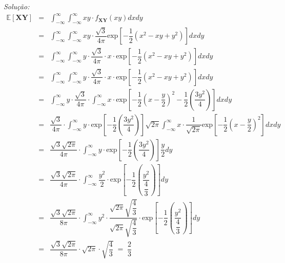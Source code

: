 \documentclass[a4paper, 11pt]{article}
\begin{document}
\noindent
\textit{Solução:} \\
\begin{equation*}
\begin{array}{lclllll}
\mathds{E}[\mathbf{X}\mathbf{Y}] & = & \displaystyle\int_{-\infty}^{\infty}\displaystyle\int_{-\infty}^{\infty} xy \cdot f_{\mathbf{XY}}(xy) dxdy \\[10pt] 

& = & \displaystyle\int_{-\infty}^{\infty}\displaystyle\int_{-\infty}^{\infty} xy \cdot \dfrac{\sqrt{3}}{4\pi}\mbox{exp}\left[ -\dfrac{1}{2} (x^{2} - xy + y^{2}) \right] dxdy \\[10pt] 

& = & \displaystyle\int_{-\infty}^{\infty}\displaystyle\int_{-\infty}^{\infty} y \cdot \dfrac{\sqrt{3}}{4\pi} \cdot x \cdot \mbox{exp}\left[ -\dfrac{1}{2} (x^{2} - xy + y^{2}) \right] dxdy \\[10pt] 
& = & \displaystyle\int_{-\infty}^{\infty}\displaystyle\int_{-\infty}^{\infty} y \cdot \dfrac{\sqrt{3}}{4\pi} \cdot x \cdot \mbox{exp}\left[ -\dfrac{1}{2} (x^{2} - xy + y^{2}) \right] dxdy \\[10pt] 

& = & \displaystyle\int_{-\infty}^{\infty} y \cdot \dfrac{\sqrt{3}}{4\pi} \cdot \displaystyle\int_{-\infty}^{\infty} x \cdot \mbox{exp}\left[ -\dfrac{1}{2} \left(x -  \dfrac{y}{2}\right)^{2} - \dfrac{1}{2} \left(\dfrac{3y^{2}}{4}\right) \right] dxdy \\[10pt] 

& = & \dfrac{\sqrt{3}}{4\pi} \cdot \displaystyle\int_{-\infty}^{\infty} y \cdot \mbox{exp}\left[ - \dfrac{1}{2} \left(\dfrac{3y^{2}}{4}\right) \right] \sqrt{2\pi} \displaystyle\int_{-\infty}^{\infty} x \cdot \dfrac{1}{\sqrt{2\pi}}\mbox{exp}\left[ -\dfrac{1}{2} \left(x -  \dfrac{y}{2}\right)^{2}  \right] dxdy \\[10pt] 

& = & \dfrac{\sqrt{3}\sqrt{2\pi}}{4\pi} \cdot \displaystyle\int_{-\infty}^{\infty} y \cdot \mbox{exp}\left[ - \dfrac{1}{2} \left(\dfrac{3y^{2}}{4}\right) \right] \dfrac{y}{2} dy \\[15pt] 

& = & \dfrac{\sqrt{3}\sqrt{2\pi}}{4\pi} \cdot \displaystyle\int_{-\infty}^{\infty} \dfrac{y^{2}}{2} \cdot \mbox{exp}\left[ - \dfrac{1}{2} \left(\dfrac{y^{2}}{\dfrac{4}{3}}\right) \right]  dy \\[10pt] 

& = & \dfrac{\sqrt{3}\sqrt{2\pi}}{8\pi} \cdot \displaystyle\int_{-\infty}^{\infty} y^{2} \cdot \dfrac{\sqrt{2\pi}\sqrt{\dfrac{4}{3}}}{\sqrt{2\pi}\sqrt{\dfrac{4}{3}}} \cdot \mbox{exp}\left[ - \dfrac{1}{2} \left(\dfrac{y^{2}}{\dfrac{4}{3}}\right) \right]  dy \\[20pt] 


& = & \dfrac{\sqrt{3}\sqrt{2\pi}}{8\pi} \cdot \sqrt{2\pi}\cdot\sqrt{\dfrac{4}{3}} \; = \; \dfrac{2}{3} \\[10pt] 

\end{array}
\end{equation*}
\end{document}
